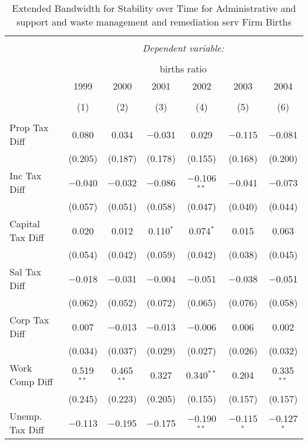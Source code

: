 
\begin{table}[!htbp] \centering 
  \caption{Extended Bandwidth for Stability over Time for  Administrative and support and waste management and remediation serv Firm Births} 
  \label{56 ebyear} 
\small 
\begin{tabular}{@{\extracolsep{5pt}}lcccccc} 
\\[-1.8ex]\hline 
\hline \\[-1.8ex] 
 & \multicolumn{6}{c}{\textit{Dependent variable:}} \\ 
\cline{2-7} 
\\[-1.8ex] & \multicolumn{6}{c}{births ratio} \\ 
 & 1999 & 2000 & 2001 & 2002 & 2003 & 2004 \\ 
\\[-1.8ex] & (1) & (2) & (3) & (4) & (5) & (6)\\ 
\hline \\[-1.8ex] 
 Prop Tax Diff & 0.080 & 0.034 & $-$0.031 & 0.029 & $-$0.115 & $-$0.081 \\ 
  & (0.205) & (0.187) & (0.178) & (0.155) & (0.168) & (0.200) \\ 
  Inc Tax Diff & $-$0.040 & $-$0.032 & $-$0.086 & $-$0.106$^{**}$ & $-$0.041 & $-$0.073 \\ 
  & (0.057) & (0.051) & (0.058) & (0.047) & (0.040) & (0.044) \\ 
  Capital Tax Diff & 0.020 & 0.012 & 0.110$^{*}$ & 0.074$^{*}$ & 0.015 & 0.063 \\ 
  & (0.054) & (0.042) & (0.059) & (0.042) & (0.038) & (0.045) \\ 
  Sal Tax Diff & $-$0.018 & $-$0.031 & $-$0.004 & $-$0.051 & $-$0.038 & $-$0.051 \\ 
  & (0.062) & (0.052) & (0.072) & (0.065) & (0.076) & (0.058) \\ 
  Corp Tax Diff & 0.007 & $-$0.013 & $-$0.013 & $-$0.006 & 0.006 & 0.002 \\ 
  & (0.034) & (0.037) & (0.029) & (0.027) & (0.026) & (0.032) \\ 
  Work Comp Diff & 0.519$^{**}$ & 0.465$^{**}$ & 0.327 & 0.340$^{**}$ & 0.204 & 0.335$^{**}$ \\ 
  & (0.245) & (0.223) & (0.205) & (0.155) & (0.157) & (0.157) \\ 
  Unemp. Tax Diff & $-$0.113 & $-$0.195 & $-$0.175 & $-$0.190$^{**}$ & $-$0.115$^{*}$ & $-$0.127$^{*}$ \\ 

\end{tabular}
\end{table}
